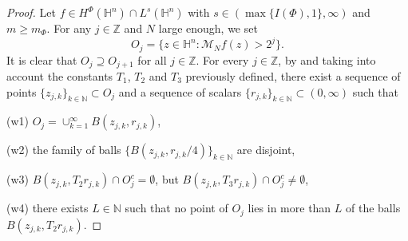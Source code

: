 \documentclass[oneside,10pt]{article}
\begin{document}
\begin{proof}
Let $f \in H^{\Phi}(\mathbb{H}^n) \cap L^{s}(\mathbb{H}^n)$ with $s \in (\max \{I(\Phi), 1\},\infty)$ and $m \geq m_{\Phi}$. For any $j \in \mathbb{Z}$ and $N$ large enough, we set
\[
O_j = \{ z \in \mathbb{H}^n : \mathcal{M}_N f(z) > 2^{j} \}.
\]
It is clear that $O_j \supseteq O_{j+1}$ for all $j \in \mathbb{Z}$. For every $j \in \mathbb{Z}$, by \cite[Whitney Lemma 1.67]{Foll-St} and taking into account the constants $T_1$, $T_2$ and $T_3$ previously defined, there exist a sequence of points $\{ z_{j,k} \}_{k \in \mathbb{N}} \subset O_j$ and a sequence of scalars $\{ r_{j,k} \}_{k \in \mathbb{N}} \subset (0, \infty)$ such that

(w1) $O_j = \cup_{k=1}^{\infty} B(z_{j,k}, r_{j,k})$,

(w2) the family of balls $\{ B(z_{j,k}, r_{j,k}/4) \}_{k \in \mathbb{N}}$ are disjoint,

(w3) $B(z_{j,k}, T_2 r_{j,k}) \cap O_j^c = \emptyset$, but $B(z_{j,k}, T_3 r_{j,k}) \cap O_j^c \neq \emptyset$,

(w4) there exists $L \in \mathbb{N}$ such that no point of $O_j$ lies in more than $L$ of the balls $B(z_{j,k}, T_2 r_{j,k})$.


\end{proof}
\end{document}
